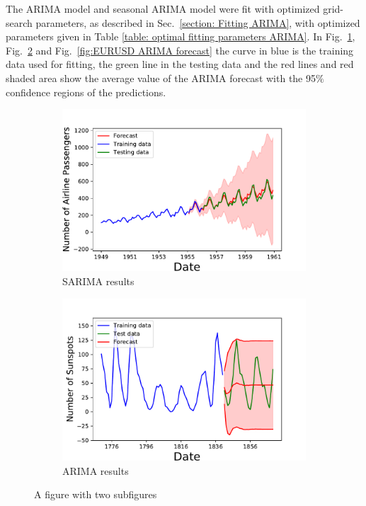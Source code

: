 \documentclass[10pt,a4paper]{article}
\begin{document}
The ARIMA model and seasonal ARIMA model were fit with optimized grid-search parameters, as described in Sec.~\ref{section: Fitting ARIMA}, with optimized parameters given in Table \ref{table: optimal fitting parameters ARIMA}. In Fig.~\ref{fig:Airline ARIMA forecast}, Fig.~\ref{fig:Sunspot ARIMA forecast} and Fig.~\ref{fig:EURUSD ARIMA forecast} the curve in blue is the training data used for fitting, the green line in the testing data and the red lines and red shaded area show the average value of the ARIMA forecast with the 95$\%$ confidence regions of the predictions.
\begin{figure}[h]
\centering
\begin{subfigure}{.5\textwidth}
  \centering
  \includegraphics[scale=0.41]{Airline_Passengers_Forecast.pdf}
  \caption{SARIMA results}
  \label{fig:Airline ARIMA forecast}
\end{subfigure}%
\begin{subfigure}{.5\textwidth}
  \centering
  \includegraphics[scale=0.41]{Sunspot_Forecast.pdf}
\caption{ARIMA results}
  \label{fig:Sunspot ARIMA forecast}
\end{subfigure}
\caption{A figure with two subfigures}
\label{fig: Airline and SUNSPOT ARIMA}
\end{figure}
\end{document}
